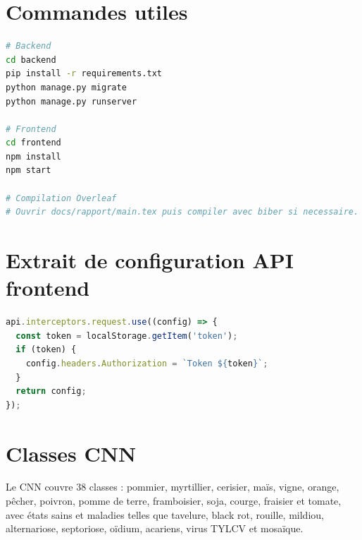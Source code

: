 \section{Commandes utiles}
\begin{lstlisting}[language=bash]
# Backend
cd backend
pip install -r requirements.txt
python manage.py migrate
python manage.py runserver

# Frontend
cd frontend
npm install
npm start

# Compilation Overleaf
# Ouvrir docs/rapport/main.tex puis compiler avec biber si necessaire.
\end{lstlisting}

\section{Extrait de configuration API frontend}
\begin{lstlisting}[language=JavaScript]
api.interceptors.request.use((config) => {
  const token = localStorage.getItem('token');
  if (token) {
    config.headers.Authorization = `Token ${token}`;
  }
  return config;
});
\end{lstlisting}

\section{Classes CNN}
Le CNN couvre 38 classes : pommier, myrtillier, cerisier, maïs, vigne, orange, pêcher, poivron, pomme de terre, framboisier, soja, courge, fraisier et tomate, avec états sains et maladies telles que tavelure, black rot, rouille, mildiou, alternariose, septoriose, oïdium, acariens, virus TYLCV et mosaïque.
